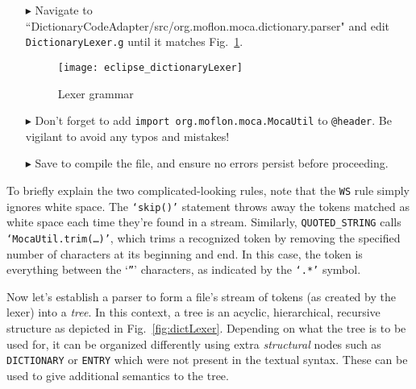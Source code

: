 \begin{itemize}
  
\item[$\blacktriangleright$] Navigate to ``Diction\-ary\-Code\-Adap\-ter/src/org.moflon.moca.dict\-ion\-ary\-.pars\-er" and edit \texttt{DictionaryLexer.g}
until it matches Fig.~\ref{eclipse:dictionaryLexer}. 


\newpage

\begin{figure}[!htbp]
\begin{center}
  \texttt{[image: eclipse\_dictionaryLexer]}
  \caption{Lexer grammar}
  \label{eclipse:dictionaryLexer}
\end{center}
\end{figure}

\item[$\blacktriangleright$] Don't forget to add \texttt{import org.moflon.moca.MocaUtil} to \texttt{@header}. Be vigilant to avoid any typos and mistakes!

\vspace{0.5cm}

\item[$\blacktriangleright$] Save to compile the file, and ensure no errors persist before proceeding.

\end{itemize}

\vspace{0.25cm}

To briefly explain the two complicated-looking rules, note that the \texttt{WS} rule simply ignores white space. The \texttt{`skip()'} statement throws away the
tokens matched as white space each time they're found in a stream. Similarly, \texttt{QUOTED\_STRING} calls \texttt{`MocaUtil.trim(\ldots)'}, which trims a
recognized token by removing the specified number of characters at its beginning and end. In this case, the token is everything between the `\texttt{''}'
characters, as indicated by the \texttt{`.*'} symbol.

\newpage

Now let's establish a parser to form a file's stream of tokens (as created by the lexer) into a \emph{tree}. In this context, a tree is an acyclic,
hierarchical, recursive structure as depicted in Fig.~\ref{fig:dictLexer}. Depending on what the tree is to be used for, it can be organized differently
using extra \emph{structural} nodes such as \texttt{DICTIONARY} or \texttt{ENTRY} which were not present in the textual syntax. These can be used to give
additional semantics to the tree.

